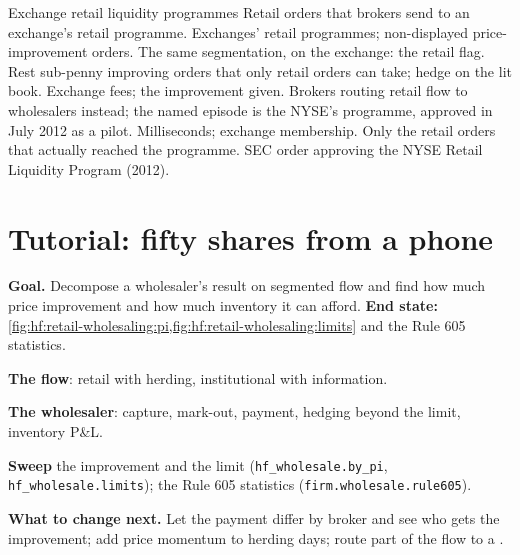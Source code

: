 \begin{strategyfile}{Exchange retail liquidity programmes}\label{strat:hf:retail-wholesaling:rlp}
 Retail orders that brokers send to an exchange's retail programme.
 Exchanges' retail programmes; non-displayed price-improvement orders.
 The same segmentation, on the exchange: the retail flag.
 Rest sub-penny improving orders that only retail orders can take; hedge on the lit book.
 Exchange fees; the improvement given.
 Brokers routing retail flow to wholesalers instead; the named episode is the NYSE's programme, approved in July 2012 as a pilot.
 Milliseconds; exchange membership.
 Only the retail orders that actually reached the programme.
 SEC order approving the NYSE Retail Liquidity Program (2012).
\end{strategyfile}

\section{Tutorial: fifty shares from a phone}\label{tut:hf:retail-wholesaling:tut}

\begin{tutorial}
\textbf{Goal.} Decompose a wholesaler's result on segmented flow and find how much price improvement and how much inventory it can afford.
\textbf{End state:} \cref{fig:hf:retail-wholesaling:pi,fig:hf:retail-wholesaling:limits} and the Rule 605 statistics.
\begin{tutsteps}
\item \textbf{The flow}: retail with herding, institutional with information.
\label{lst:hf:retail-wholesaling:flow}
\item \textbf{The wholesaler}: capture, mark-out, payment, hedging beyond the limit, inventory P\&L.
\label{lst:hf:retail-wholesaling:wholesale}
\item \textbf{Sweep} the improvement and the limit (\texttt{hf\_wholesale.by\_pi}, \texttt{hf\_wholesale.limits}); the Rule 605 statistics
(\texttt{firm.wholesale.rule605}).
\end{tutsteps}
\textbf{What to change next.} Let the payment differ by broker and see who gets the improvement; add price momentum to herding days; route part of
the flow to a .
\end{tutorial}

